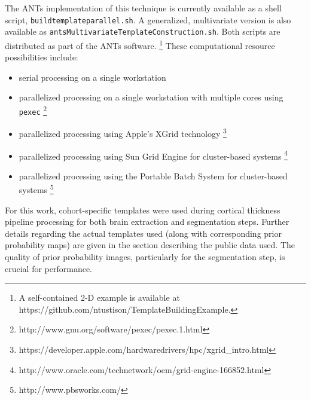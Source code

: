 The ANTs implementation of this technique is currently available as a shell script, 
{\tt buildtemplateparallel.sh}.  A generalized, multivariate version is also available as
{\tt antsMultivariateTemplateConstruction.sh}.  Both scripts are distributed as part of
 the ANTs software.  
\footnote{
A self-contained 2-D example is available at https://github.com/ntustison/TemplateBuildingExample.
}
These computational resource possibilities include:
\begin{itemize}
  \item serial processing on a single workstation
  \item parallelized processing on a single workstation with multiple cores using \verb#pexec#%
  \footnote{http://www.gnu.org/software/pexec/pexec.1.html}
  \item parallelized processing using Apple's XGrid technology%
  \footnote{https://developer.apple.com/hardwaredrivers/hpc/xgrid\_intro.html}
  \item parallelized processing using Sun Grid Engine for cluster-based systems%
  \footnote{http://www.oracle.com/technetwork/oem/grid-engine-166852.html}
  \item parallelized processing using the Portable Batch System for cluster-based systems%
  \footnote{http://www.pbsworks.com/}  
\end{itemize}

For this work, cohort-specific templates were used during cortical thickness pipeline
processing for both brain extraction and segmentation steps.  Further details regarding
the actual templates used (along with corresponding prior probability maps) are given 
in the section describing the public data used.  The quality of prior probability images,
particularly for the segmentation step, is crucial for performance.  

